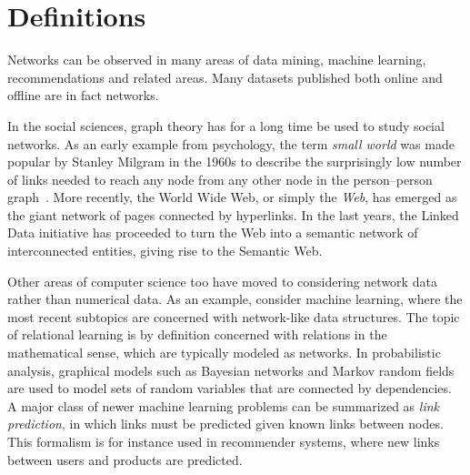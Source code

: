 \documentclass[11pt,a4paper]{book}
\begin{document}
\section{Definitions}
\label{sec:network-theory}
Networks can be observed in many areas of data mining, machine learning,
recommendations and related areas.  Many datasets published
both online and offline are in fact networks.  

In the social sciences, graph theory has for a long time be used to
study social networks.  As an early example from psychology, the term
\emph{small world} was made popular by Stanley Milgram in the 1960s to
describe the surprisingly low number of links needed to reach any node
from any other node in the person--person graph~\cite{b567}. 
More recently, the World Wide Web, or simply the \emph{Web}, has emerged
as the giant network of pages connected by hyperlinks.   
In the last years, the Linked Data initiative has proceeded to turn the Web
into a semantic network of interconnected entities, giving rise to the
Semantic Web.  

Other areas of computer science too have moved to considering network
data rather than numerical data.  As an example, consider machine learning,
where the most recent subtopics are concerned with network-like data
structures.
The topic of relational learning is by definition concerned with relations
in the mathematical sense, which are typically modeled as networks. 
In probabilistic analysis, graphical models such as Bayesian networks and
Markov random fields are used to model sets of random variables that are
connected by dependencies. 
A major class of newer machine learning problems can be summarized as
\emph{link 
  prediction}, in which links must be predicted given known links
between nodes.  This formalism is for instance used in recommender
systems, where new links between users and products are predicted. 
\end{document}

